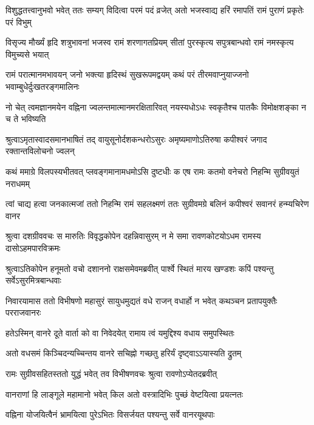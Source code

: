 \fourlineindentedshloka
{विशुद्धतत्त्वानुभवो भवेत् ततः}
{सम्यग् विदित्वा परमं पदं व्रजेत्} %
{अतो भजस्वाद्य हरिं रमापतिं}
{रामं पुराणं प्रकृतेः परं विभुम्}

\fourlineindentedshloka
{विसृज्य मौर्ख्यं हृदि शत्रुभावनां}
{भजस्व रामं शरणागतप्रियम्}
{सीतां पुरस्कृत्य सपुत्रबान्धवो}
{रामं नमस्कृत्य विमुच्यसे भयात्} %

\fourlineindentedshloka
{रामं परात्मानमभावयन् जनो}
{भक्त्या हृदिस्थं सुखरूपमद्वयम्}
{कथं परं तीरमवाप्नुयाज्जनो}
{भवाम्बुधेर्दुःखतरङ्गमालिनः} %

\fourlineindentedshloka
{नो चेत् त्वमज्ञानमयेन वह्निना}
{ज्वलन्तमात्मानमरक्षितारिवत्}
{नयस्यधोऽधः स्वकृतैश्च पातकैः}
{विमोक्षशङ्का न च ते भविष्यति} %

\fourlineindentedshloka
{श्रुत्वाऽमृतास्वादसमानभाषितं}
{तद् वायुसूनोर्दशकन्धरोऽसुरः}
{अमृष्यमाणोऽतिरुषा कपीश्वरं}
{जगाद रक्तान्तविलोचनो ज्वलन्} %

\fourlineindentedshloka
{कथं ममाग्रे विलपस्यभीतवत्}
{प्लवङ्गमानामधमोऽसि दुष्टधीः}
{क एष रामः कतमो वनेचरो}
{निहन्मि सुग्रीवयुतं नराधमम्} %

\fourlineindentedshloka
{त्वां चाद्य हत्वा जनकात्मजां ततो}
{निहन्मि रामं सहलक्ष्मणं ततः}
{सुग्रीवमग्रे बलिनं कपीश्वरं}
{सवानरं हन्म्यचिरेण वानर}


\fourlineindentedshloka
{श्रुत्वा दशग्रीववचः स मारुतिः}
{विवृद्धकोपेन दहन्निवासुरम्} %
{न मे समा रावणकोटयोऽधम}
{रामस्य दासोऽहमपारविक्रमः}

\fourlineindentedshloka
{श्रुत्वाऽतिकोपेन हनूमतो वचो}
{दशाननो राक्षसमेवमब्रवीत्} %
{पार्श्वे स्थितं मारय खण्डशः कपिं}
{पश्यन्तु सर्वेऽसुरमित्रबान्धवाः}

\fourlineindentedshloka
{निवारयामास ततो विभीषणो}
{महासुरं सायुधमुद्यतं वधे}
{राजन् वधार्हो न भवेत् कथञ्चन}
{प्रतापयुक्तैः परराजवानरः} %

\twolineshloka
{हतेऽस्मिन् वानरे दूते वार्ता को वा निवेदयेत्}
{रामाय त्वं यमुद्दिश्य वधाय समुपस्थितः} %

\twolineshloka
{अतो वधसमं किञ्चिदन्यच्चिन्तय वानरे}
{सचिह्नो गच्छतु हरिर्यं दृष्ट्वाऽऽयास्यति द्रुतम्} %

\twolineshloka
{रामः सुग्रीवसहितस्ततो युद्धं भवेत् तव}
{विभीषणवचः श्रुत्वा रावणोऽप्येतदब्रवीत्} %

\twolineshloka
{वानराणां हि लाङ्गूले महामानो भवेत् किल}
{अतो वस्त्रादिभिः पुच्छं वेष्टयित्वा प्रयत्नतः} %

\twolineshloka
{वह्निना योजयित्वैनं भ्रामयित्वा पुरेऽभितः}
{विसर्जयत पश्यन्तु सर्वे वानरयूथपाः} %

